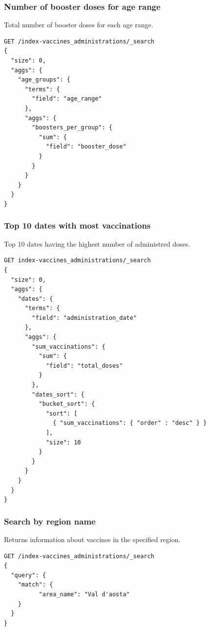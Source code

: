 \documentclass[12pt, a4paper]{article}
\begin{document}
\subsubsection{Number of booster doses for age range}
Total number of booster doses for each age range.
\begin{tcolorbox}[fontupper=\scriptsize]
  \begin{verbatim}
GET /index-vaccines_administrations/_search
{
  "size": 0,
  "aggs": {
    "age_groups": {
      "terms": { 
        "field": "age_range" 
      },
      "aggs": {
        "boosters_per_group": {
          "sum": {
            "field": "booster_dose"
          }
        }
      }
    }
  }
}
  \end{verbatim}
\end{tcolorbox}

\subsubsection{Top 10 dates with most vaccinations}
Top 10 dates having the highest number of administred doses.
\begin{tcolorbox}[fontupper=\scriptsize]
  \begin{verbatim}
GET index-vaccines_administrations/_search
{
  "size": 0,
  "aggs": {
    "dates": {
      "terms": { 
        "field": "administration_date" 
      },
      "aggs": {
        "sum_vaccinations": {
          "sum": {
            "field": "total_doses"
          }
        },
        "dates_sort": {
          "bucket_sort": {
            "sort": [
              { "sum_vaccinations": { "order" : "desc" } }
            ],
            "size": 10
          }
        }
      }
    }
  }
}
  \end{verbatim}
\end{tcolorbox}

\subsubsection{Search by region name}
Returns information about vaccines in the specified region.
\begin{tcolorbox}[fontupper=\scriptsize]
  \begin{verbatim}
GET /index-vaccines_administrations/_search
{
  "query": {
    "match": {
          "area_name": "Val d'aosta"
    }
  }
}
  \end{verbatim}
\end{tcolorbox}
\end{document}
